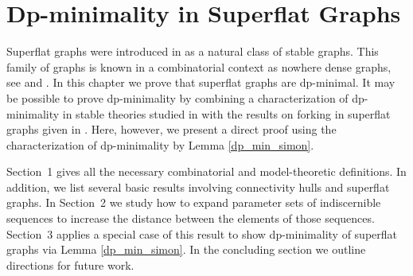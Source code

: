 \chapter{Dp-minimality in Superflat Graphs}
Superflat graphs were introduced in \cite{stable_graphs} as a natural class of stable graphs.
This family of graphs is known in a combinatorial context as nowhere dense graphs, see \cite{adleradler} and \cite{nowhere}.
In this chapter we prove that superflat graphs are dp-minimal.
It may be possible to prove dp-minimality by combining a characterization of dp-minimality in stable theories studied in \cite{dpstable}
with the results on forking in superflat graphs given in \cite{ivanov}.
Here, however, we present a direct proof using the characterization of dp-minimality by Lemma \ref{dp_min_simon}.

Sec\-tion~1 gives all the necessary combinatorial and model-theoretic definitions.
In addition, we list several basic results involving connectivity hulls and superflat graphs.
In Sec\-tion~2 we study how to expand parameter sets of indiscernible sequences to increase the distance between the elements of those sequences.
Sec\-tion~3 applies a special case of this result to show dp-minimality of superflat graphs via Lemma \ref{dp_min_simon}.
In the concluding section we outline directions for future work.

